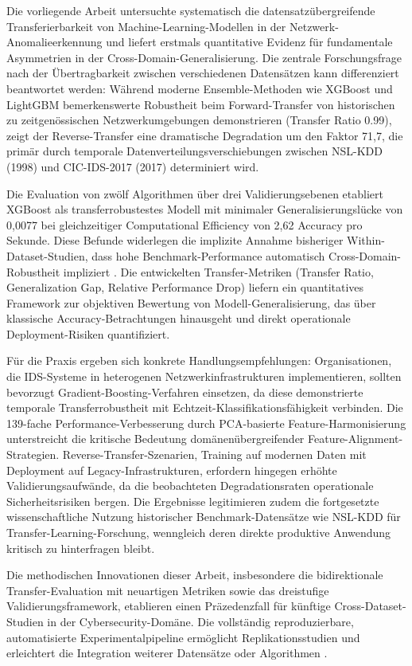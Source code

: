 \documentclass[11pt,a4paper]{article}
\begin{document}
    Die vorliegende Arbeit untersuchte systematisch die datensatzübergreifende Transferierbarkeit von Machine-Learning-Modellen in der Netzwerk-Anomalieerkennung und liefert erstmals quantitative Evidenz für fundamentale Asymmetrien in der Cross-Domain-Generalisierung. Die zentrale Forschungsfrage nach der Übertragbarkeit zwischen verschiedenen Datensätzen kann differenziert beantwortet werden: Während moderne Ensemble-Methoden wie XGBoost und LightGBM bemerkenswerte Robustheit beim Forward-Transfer von historischen zu zeitgenössischen Netzwerkumgebungen demonstrieren (Transfer Ratio 0.99), zeigt der Reverse-Transfer eine dramatische Degradation um den Faktor 71,7, die primär durch temporale Datenverteilungsverschiebungen zwischen NSL-KDD (1998) und CIC-IDS-2017 (2017) determiniert wird.

    Die Evaluation von zwölf Algorithmen über drei Validierungsebenen etabliert XGBoost als transferrobustestes Modell mit minimaler Generalisierungslücke von 0,0077 bei gleichzeitiger Computational Efficiency von 2,62 Accuracy pro Sekunde. Diese Befunde widerlegen die implizite Annahme bisheriger Within-Dataset-Studien, dass hohe Benchmark-Performance automatisch Cross-Domain-Robustheit impliziert \parencite{Mourouzis2021}. Die entwickelten Transfer-Metriken (Transfer Ratio, Generalization Gap, Relative Performance Drop) liefern ein quantitatives Framework zur objektiven Bewertung von Modell-Generalisierung, das über klassische Accuracy-Betrachtungen hinausgeht und direkt operationale Deployment-Risiken quantifiziert.

    Für die Praxis ergeben sich konkrete Handlungsempfehlungen: Organisationen, die IDS-Systeme in heterogenen Netzwerkinfrastrukturen implementieren, sollten bevorzugt Gradient-Boosting-Verfahren einsetzen, da diese demonstrierte temporale Transferrobustheit mit Echtzeit-Klassifikationsfähigkeit verbinden. Die 139-fache Performance-Verbesserung durch PCA-basierte Feature-Harmonisierung unterstreicht die kritische Bedeutung domänenübergreifender Feature-Alignment-Strategien. Reverse-Transfer-Szenarien, Training auf modernen Daten mit Deployment auf Legacy-Infrastrukturen, erfordern hingegen erhöhte Validierungsaufwände, da die beobachteten Degradationsraten operationale Sicherheitsrisiken bergen. Die Ergebnisse legitimieren zudem die fortgesetzte wissenschaftliche Nutzung historischer Benchmark-Datensätze wie NSL-KDD für Transfer-Learning-Forschung, wenngleich deren direkte produktive Anwendung kritisch zu hinterfragen bleibt.

    Die methodischen Innovationen dieser Arbeit, insbesondere die bidirektionale Transfer-Evaluation mit neuartigen Metriken sowie das dreistufige Validierungsframework, etablieren einen Präzedenzfall für künftige Cross-Dataset-Studien in der Cybersecurity-Domäne. Die vollständig reproduzierbare, automatisierte Experimentalpipeline ermöglicht Replikationsstudien und erleichtert die Integration weiterer Datensätze oder Algorithmen \parencite{Weirauch2025}.
\end{document}
